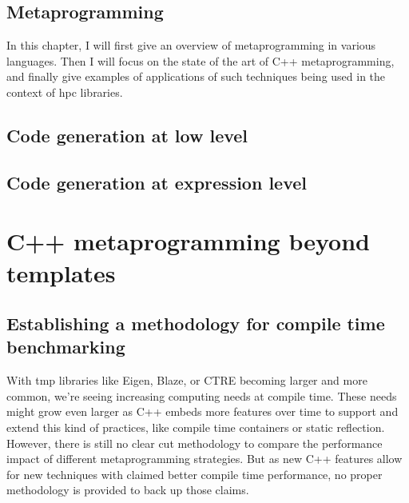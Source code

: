 \documentclass[english,12pt,a4paper]{book}
\providecommand{\cpp}{\textsc{C++}\xspace}
\begin{document}
\chapter{
  Metaprogramming
}

In this chapter, I will first give an overview of metaprogramming in
various languages. Then I will focus on the state of the art
of \cpp metaprogramming, and finally give examples of applications
of such techniques being used in the context of \gls{hpc} libraries.




\chapter{
  Code generation at low level
}



\chapter{
  Code generation at expression level
}



\part{C++ metaprogramming beyond templates}

\chapter{
  Establishing a methodology for compile time benchmarking
}

With \gls{tmp} libraries like Eigen\cite{eigen}, Blaze\cite{blazelib},
or CTRE\cite{ctre} becoming larger and more common,
we're seeing increasing computing needs at compile time. These needs might grow
even larger as \cpp embeds more features over time to support and extend this
kind of practices, like compile time containers\cite{more-constexpr-containers}
or static reflection\cite{static-reflection}. However, there is still no clear
cut methodology to compare the performance impact of different metaprogramming
strategies. But as new \cpp features allow for new techniques with claimed
better compile time performance, no proper methodology is provided to back up
those claims.
\end{document}
